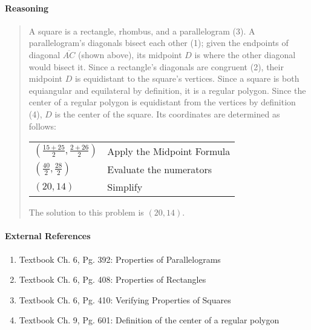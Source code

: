 \documentclass[letterpaper,12pt,twoside]{report}
\begin{document}
	\paragraph{Reasoning}
	\begin{quotation}
		
		A square is a rectangle, rhombus, and a parallelogram (3). A parallelogram's diagonals bisect each other (1); given the endpoints of diagonal $\overline{AC}$ (shown above), its midpoint $D$ is where the other diagonal would bisect it. Since a rectangle's diagonals are congruent (2), their midpoint $D$ is equidistant to the square's vertices. Since a square is both equiangular and equilateral by definition, it is a regular polygon. Since the center of a regular polygon is equidistant from the vertices by definition (4), $D$ is the center of the square. Its coordinates are determined as follows:
		
		\begin{center}
			\begin{tabular}{l | l}
				$(\frac{15+25}{2},\frac{2+26}{2})$ & Apply the Midpoint Formula \\
				$(\frac{40}{2},\frac{28}{2})$ & Evaluate the numerators \\
				$(20,14)$ & Simplify
			\end{tabular}
		\end{center}
	
		The solution to this problem is $\boxed{(20,14)}$.
	\end{quotation}
	
	\paragraph{External References}
	
	\begin{enumerate}
		\item Textbook Ch. 6, Pg. 392: Properties of Parallelograms
		\item Textbook Ch. 6, Pg. 408: Properties of Rectangles
		\item Textbook Ch. 6, Pg. 410: Verifying Properties of Squares
		\item Textbook Ch. 9, Pg. 601: Definition of the center of a regular polygon
	\end{enumerate}
	
\end{document}
